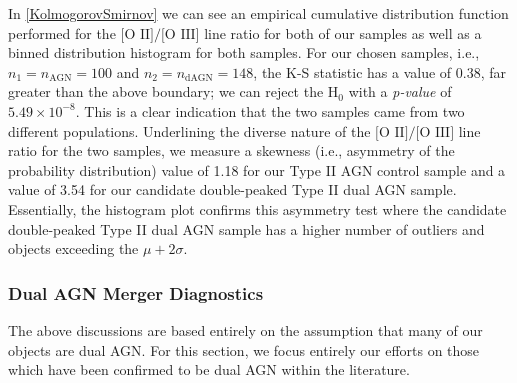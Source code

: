 In \ref{KolmogorovSmirnov} we can see an empirical cumulative distribution function  performed for the $\text{[O II]}/\text{[O III]}$ line ratio for both of our samples as well as a binned distribution histogram for both samples. For our chosen samples, i.e., $n_{1}=n_{\text{AGN}}=100$ and $n_{2}=n_{\text{dAGN}}=148$, the K-S statistic has a value of $0.38$, far greater than the above boundary; we can reject the $\text{H}_{0}$ with a \textit{p-value} of $5.49\times10^{-8}$. This is a clear indication that the two samples came from two different populations. Underlining the diverse nature of the $\text{[O II]}/\text{[O III]}$ line ratio for the two samples, we measure a skewness (i.e., asymmetry of the probability distribution) value of 1.18 for our Type II AGN control sample and a value of 3.54 for our candidate double-peaked Type II dual AGN sample. Essentially, the histogram plot confirms this asymmetry test where the candidate double-peaked Type II dual AGN sample has a higher number of outliers and objects exceeding the $\mu+{2\sigma}$.

\subsubsection{Dual AGN Merger Diagnostics}
  
The above discussions are based entirely on the assumption that many of our objects are dual AGN. For this section, we focus entirely our efforts on those which have been confirmed to be dual AGN within the literature.   
  
  
  
  
  
  
  
  
  
  
  
  
  
  
  
  
  
  
  
  
  
  
  
  
  
  
  
  